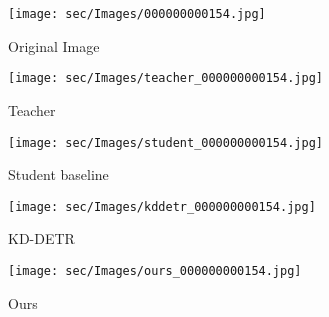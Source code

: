 \begin{figure*}
\begin{center}
    \begin{subfigure}[b]{0.19\textwidth}
        \texttt{[image: sec/Images/000000000154.jpg]}
        \caption{Original Image}\label{fig:ori_zebra}
    \end{subfigure}
    \begin{subfigure}[b]{0.19\textwidth}
        \texttt{[image: sec/Images/teacher\_000000000154.jpg]}
        \caption{Teacher}\label{fig:teacherattn_zebra}
    \end{subfigure}
    \begin{subfigure}[b]{0.19\textwidth}
        \texttt{[image: sec/Images/student\_000000000154.jpg]}
        \caption{Student baseline}\label{fig:studentattn_zebra}
    \end{subfigure}
    \begin{subfigure}[b]{0.19\textwidth}
        \texttt{[image: sec/Images/kddetr\_000000000154.jpg]}
        \caption{KD-DETR}\label{fig:kddetrattn_zebra}
    \end{subfigure}
    \begin{subfigure}[b]{0.19\textwidth}
        \texttt{[image: sec/Images/ours\_000000000154.jpg]}
        \caption{Ours}\label{fig:ourattn_zebra}
    \end{subfigure}

    

\end{center}
\end{figure*}
